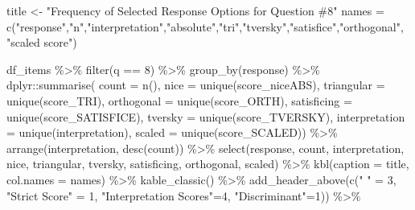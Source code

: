 \documentclass[
  letterpaper,
  DIV=11,
  numbers=noendperiod]{scrreprt}
\newenvironment{Shaded}{\begin{snugshade}}{\end{snugshade}}
\newcommand{\AttributeTok}[1]{\textcolor[rgb]{0.40,0.45,0.13}{#1}}
\newcommand{\DecValTok}[1]{\textcolor[rgb]{0.68,0.00,0.00}{#1}}
\newcommand{\FunctionTok}[1]{\textcolor[rgb]{0.28,0.35,0.67}{#1}}
\newcommand{\NormalTok}[1]{\textcolor[rgb]{0.00,0.23,0.31}{#1}}
\newcommand{\OtherTok}[1]{\textcolor[rgb]{0.00,0.23,0.31}{#1}}
\newcommand{\SpecialCharTok}[1]{\textcolor[rgb]{0.37,0.37,0.37}{#1}}
\newcommand{\StringTok}[1]{\textcolor[rgb]{0.13,0.47,0.30}{#1}}
\begin{document}
\begin{Shaded}
\begin{Highlighting}[]
\NormalTok{title }\OtherTok{\textless{}{-}} \StringTok{"Frequency of Selected Response Options for Question \#8"}
\NormalTok{names }\OtherTok{=} \FunctionTok{c}\NormalTok{(}\StringTok{"response"}\NormalTok{,}\StringTok{"n"}\NormalTok{,}\StringTok{"interpretation"}\NormalTok{,}\StringTok{"absolute"}\NormalTok{,}\StringTok{"tri"}\NormalTok{,}\StringTok{"tversky"}\NormalTok{,}\StringTok{"satisfice"}\NormalTok{,}\StringTok{"orthogonal"}\NormalTok{, }\StringTok{"scaled score"}\NormalTok{)}

\NormalTok{df\_items }\SpecialCharTok{\%\textgreater{}\%} \FunctionTok{filter}\NormalTok{(q }\SpecialCharTok{==} \DecValTok{8}\NormalTok{) }\SpecialCharTok{\%\textgreater{}\%} \FunctionTok{group\_by}\NormalTok{(response) }\SpecialCharTok{\%\textgreater{}\%}
\NormalTok{  dplyr}\SpecialCharTok{::}\FunctionTok{summarise}\NormalTok{( }\AttributeTok{count =} \FunctionTok{n}\NormalTok{(),}
                    \AttributeTok{nice =} \FunctionTok{unique}\NormalTok{(score\_niceABS),}
                    \AttributeTok{triangular =} \FunctionTok{unique}\NormalTok{(score\_TRI),}
                    \AttributeTok{orthogonal =}  \FunctionTok{unique}\NormalTok{(score\_ORTH),}
                    \AttributeTok{satisficing =}  \FunctionTok{unique}\NormalTok{(score\_SATISFICE),}
                    \AttributeTok{tversky =} \FunctionTok{unique}\NormalTok{(score\_TVERSKY),}
                    \AttributeTok{interpretation =} \FunctionTok{unique}\NormalTok{(interpretation),}
                    \AttributeTok{scaled =} \FunctionTok{unique}\NormalTok{(score\_SCALED)) }\SpecialCharTok{\%\textgreater{}\%}
  \FunctionTok{arrange}\NormalTok{(interpretation, }\FunctionTok{desc}\NormalTok{(count)) }\SpecialCharTok{\%\textgreater{}\%}
  \FunctionTok{select}\NormalTok{(response, count, interpretation, nice,}
\NormalTok{         triangular, tversky, satisficing, orthogonal, scaled) }\SpecialCharTok{\%\textgreater{}\%}
  \FunctionTok{kbl}\NormalTok{(}\AttributeTok{caption =}\NormalTok{ title, }\AttributeTok{col.names =}\NormalTok{ names) }\SpecialCharTok{\%\textgreater{}\%}  \FunctionTok{kable\_classic}\NormalTok{() }\SpecialCharTok{\%\textgreater{}\%}
  \FunctionTok{add\_header\_above}\NormalTok{(}\FunctionTok{c}\NormalTok{(}\StringTok{" "} \OtherTok{=} \DecValTok{3}\NormalTok{, }\StringTok{"Strict Score"} \OtherTok{=} \DecValTok{1}\NormalTok{, }\StringTok{"Interpretation Scores"}\OtherTok{=}\DecValTok{4}\NormalTok{, }\StringTok{"Discriminant"}\OtherTok{=}\DecValTok{1}\NormalTok{)) }\SpecialCharTok{\%\textgreater{}\%}

\end{Highlighting}
\end{Shaded}
\end{document}
